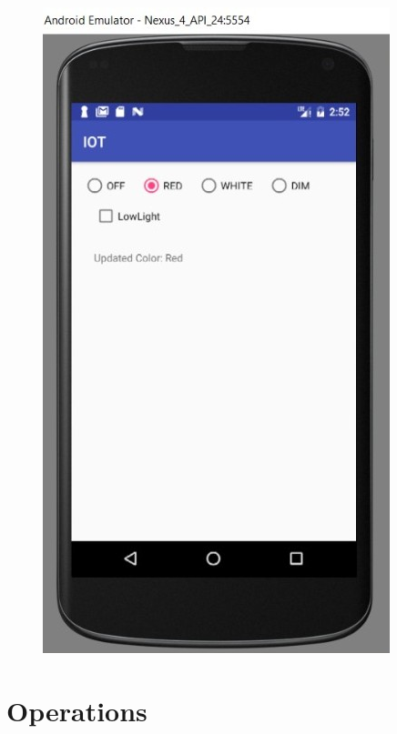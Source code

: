 \documentclass[conference]{IEEEtran}
\begin{document}
\begin{figure}[h]
	\begin{center}
		\includegraphics[width=1\linewidth]{img/androidapp}
		\caption{}
		\label{fig:fig3}
	\end{center}
\end{figure}


\section{Operations}
\end{document}
